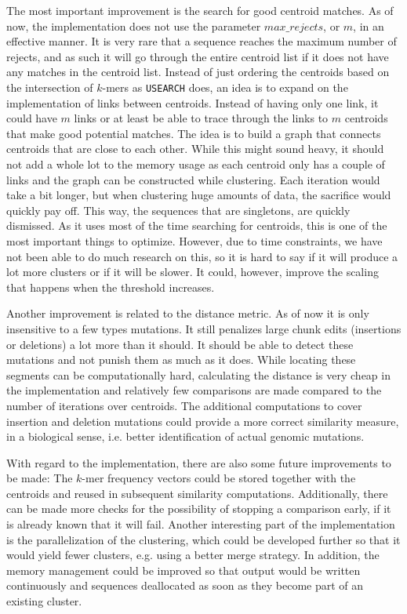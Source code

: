 The most important improvement is the search for good centroid matches. As of
now, the implementation does not use the parameter $max\_rejects$, or $m$, in
an effective manner. It is very rare that a sequence reaches the maximum
number of rejects, and as such it will go through the entire centroid list if
it does not have any matches in the centroid list. Instead of just ordering
the centroids based on the intersection of $k$-mers as \texttt{USEARCH} does,
an idea is to expand on the implementation of links between centroids. Instead
of having only one link, it could have $m$ links or at least be able to trace
through the links to $m$ centroids that make good potential matches. The idea
is to build a graph that connects centroids that are close to each other.
While this might sound heavy, it should not add a whole lot to the memory
usage as each centroid only has a couple of links and the graph can be
constructed while clustering. Each iteration would take a bit longer, but when
clustering huge amounts of data, the sacrifice would quickly pay off. This
way, the sequences that are singletons, are quickly dismissed. As it uses most
of the time searching for centroids, this is one of the most important things
to optimize. However, due to time constraints, we have not been able to do
much research on this, so it is hard to say if it will produce a lot more
clusters or if it will be slower. It could, however, improve the scaling that
happens when the threshold increases.

Another improvement is related to the distance metric. As of now it is only
insensitive to a few types mutations. It still penalizes large chunk edits
(insertions or deletions) a lot more than it should. It should be able to
detect these mutations and not punish them as much as it does. While locating
these segments can be computationally hard, calculating the distance is very
cheap in the implementation and relatively few comparisons are made compared to
the number of iterations over centroids. The additional computations to cover
insertion and deletion mutations could provide a more correct similarity
measure, in a biological sense, i.e. better identification of actual genomic
mutations.

With regard to the implementation, there are also some future improvements to
be made: The $k$-mer frequency vectors could be stored together with the
centroids and reused in subsequent similarity computations. Additionally, there
can be made more checks for the possibility of stopping a comparison early, if
it is already known that it will fail. Another interesting part of the
implementation is the parallelization of the clustering, which could be
developed further so that it would yield fewer clusters, e.g. using a better
merge strategy. In addition, the memory management could be improved so that
output would be written continuously and sequences deallocated as soon as they
become part of an existing cluster.

